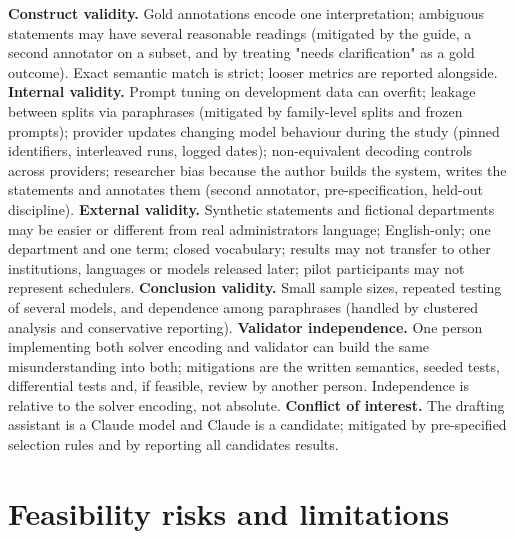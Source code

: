 \documentclass[
  11pt,a4paper,oneside]{report}
\begin{document}
\textbf{Construct validity.} Gold annotations encode one interpretation;
ambiguous statements may have several reasonable readings (mitigated by
the guide, a second annotator on a subset, and by treating "needs
clarification" as a gold outcome). Exact semantic match is strict;
looser metrics are reported alongside. \textbf{Internal validity.}
Prompt tuning on development data can overfit; leakage between splits
via paraphrases (mitigated by family-level splits and frozen prompts);
provider updates changing model behaviour during the study (pinned
identifiers, interleaved runs, logged dates); non-equivalent decoding
controls across providers; researcher bias because the author builds the
system, writes the statements and annotates them (second annotator,
pre-specification, held-out discipline). \textbf{External validity.}
Synthetic statements and fictional departments may be easier or
different from real administrators\textquotesingle{} language;
English-only; one department and one term; closed vocabulary; results
may not transfer to other institutions, languages or models released
later; pilot participants may not represent schedulers.
\textbf{Conclusion validity.} Small sample sizes, repeated testing of
several models, and dependence among paraphrases (handled by clustered
analysis and conservative reporting). \textbf{Validator independence.}
One person implementing both solver encoding and validator can build the
same misunderstanding into both; mitigations are the written semantics,
seeded tests, differential tests and, if feasible, review by another
person. Independence is relative to the solver encoding, not absolute.
\textbf{Conflict of interest.} The drafting assistant is a Claude model
and Claude is a candidate; mitigated by pre-specified selection rules
and by reporting all candidates\textquotesingle{} results.

\hypertarget{feasibility-risks-and-limitations}{%
\section{Feasibility risks and
limitations}\label{feasibility-risks-and-limitations}}
\end{document}
